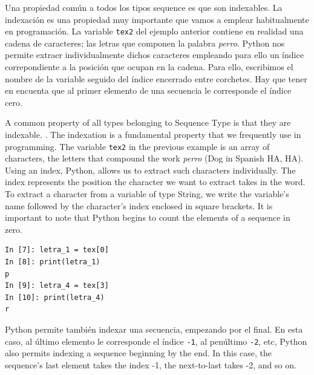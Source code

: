 \begin{paracol}{2}
Una propiedad común a todos los tipos sequence es que son indexables. La indexación es una propiedad muy importante que vamos a emplear habitualmente en programación. La variable \texttt{tex2} del ejemplo anterior contiene en realidad una cadena de caracteres; las letras que componen la palabra \emph{perro}. Python nos permite extraer individualmente dichos caracteres empleando para ello un índice correpondiente a la posición que ocupan en la cadena. Para ello, escribimos el nombre de la variable seguido del índice encerrado entre corchetes. Hay que tener en encuenta que al primer elemento de una secuencia le corresponde el índice cero.

\switchcolumn
A common property of all types belonging to Sequence Type is that they are indexable. . The indexation is a fundamental property that we frequently use in programming. The variable \texttt{tex2} in the previous example is an array of characters, the letters that compound the work \emph{perro} (Dog in Spanish HA,  HA). Using an index, Python, allows us to extract such characters individually. The index represents the position the character we want to extract takes in the word. To extract a character from a variable of type String, we write the variable's name followed by the character's index enclosed in square brackets. It is important to note that Python begins to count the elements of a sequence in zero.  
\end{paracol}

\begin{center}
    \begin{minipage}{0.3\textwidth}
\begin{verbatim}
In [7]: letra_1 = tex[0]
In [8]: print(letra_1)
p
In [9]: letra_4 = tex[3]
In [10]: print(letra_4)
r
\end{verbatim}
\end{minipage}
\end{center}
\begin{paracol}{2}
Python permite también indexar una secuencia, empezando por el final. En esta caso, al último elemento le corresponde el índice  \texttt{-1}, al penúltimo \texttt{-2}, etc,
\switchcolumn
Python also permits indexing a sequence beginning by the end. In this case, the sequence's last element takes the index -1, the next-to-last takes -2, and so on. 
\end{paracol}

